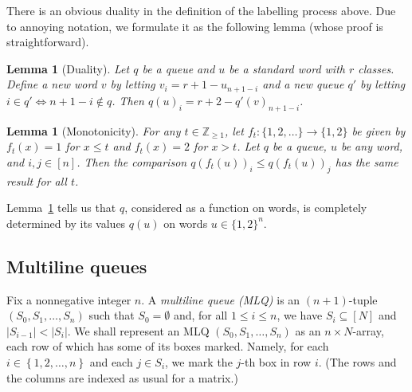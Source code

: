 \documentclass[reqno]{amsart}
\newcommand{\0}{\phantom{c}}
\DeclareMathOperator{\inter}{int} %
\newcommand{\ZZ}{\mathbb{Z}}
\newcommand{\set}[1]{\left\{ #1 \right\}}
\newcommand{\tup}[1]{\left( #1 \right)}
\newcommand{\ive}[1]{\left[ #1 \right]}
\newcommand{\defn}[1]{{\color{darkred}\emph{#1}}} %
\theoremstyle{plain}
\newtheorem{lemma}[thm]{Lemma}
\theoremstyle{definition}
\newtheorem{dfn}[thm]{Definition}
\newtheorem{remark}[thm]{Remark}
\numberwithin{equation}{section}
\begin{document}
There is an obvious duality in the definition of the labelling process above.
Due to annoying notation, we formulate it as the following lemma (whose proof is straightforward).

\begin{lemma}[Duality]
  Let $q$ be a queue and $u$ be a standard word with $r$ classes. Define a new word $v$ by letting $v_i = r + 1 - u_{n+1-i}$ and a new queue $q'$ by letting $i \in q' \Leftrightarrow n+1-i \notin q$.
 Then $q(u)_i = r + 2 - q'(v)_{n+1-i}$.
\end{lemma}


\begin{lemma}[Monotonicity]
\label{le:mono}
  For any $t \in \ZZ_{\geq 1}$, let $f_t \colon \{1,2, \ldots\} \to \{1,2\}$ be given by $f_t(x) = 1$ for $x \leq t$ and $f_t(x) = 2$ for $x > t$. Let $q$ be a queue, $u$ be any word, and $i,j\in[n]$. Then the comparison $q(f_t(u))_i \leq q(f_t(u))_j$ has the same result for all $t$.
\end{lemma}

Lemma~\ref{le:mono} tells us that $q$, considered as a function on words, is completely determined by its values $q(u)$ on words $u\in\{1,2\}^n$.

\subsection{Multiline queues}

Fix a nonnegative integer $n$.
A \defn{multiline queue (MLQ)} is an $(n+1)$-tuple $(S_0, S_1, \dotsc, S_n)$ such that $S_0 = \emptyset$ and, for all $1 \leq i \leq n$, we have $S_i \subseteq \ive{N}$ and $\lvert S_{i-1} \rvert < \lvert S_i \rvert$.
We shall represent an MLQ $\tup{S_0, S_1, \ldots, S_n}$ as an
$n \times N$-array, each row of which has some of its boxes
marked. Namely, for each $i \in \set{1, 2, \ldots, n}$ and
each $j \in S_i$, we mark the $j$-th box in row $i$.
(The rows and the columns are indexed as usual for a matrix.)
\end{document}
